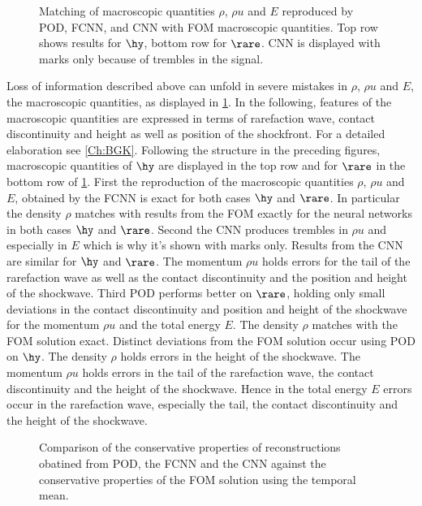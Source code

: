 \begin{figure}[H]
	
	\caption{Matching of macroscopic quantities \(\rho\), \(\rho u\) and \(E\) reproduced by POD, FCNN, and CNN with FOM macroscopic quantities. Top row shows results for \(\hy\), bottom row for \(\rare\). CNN is displayed with marks only because of trembles in the signal.}
	\label{Fig:ErrMacro}
\end{figure}
Loss of information described above can unfold in severe mistakes in \(\rho\), \(\rho u\) and \(E\), the macroscopic quantities, as displayed in \cref{Fig:ErrMacro}. In the following, features of the macroscopic quantities are expressed in terms of rarefaction wave, contact discontinuity and height as well as position of the shockfront. For a detailed elaboration see \cref{Ch:BGK}. Following the structure in the preceding figures, macroscopic quantities of \(\hy\) are displayed in the top row and for \(\rare\) in the bottom row of \cref{Fig:ErrMacro}. First the reproduction of the macroscopic quantities \(\rho\), \(\rho u\) and \(E\), obtained by the FCNN is exact for both cases \(\hy\) and \(\rare\). In particular the density \(\rho\) matches with results from the FOM exactly for the neural networks in both cases \(\hy\) and \(\rare\). Second the CNN produces trembles in \(\rho u\) and especially in \(E\) which is why it's shown with marks only. Results from the CNN are similar for \(\hy\) and \(\rare\). The momentum \(\rho u\) holds errors for the tail of the rarefaction wave as well as the contact discontinuity and the position and height of the shockwave. Third POD performs better on \(\rare\), holding only small deviations in the contact discontinuity and position and height of the shockwave for the momentum \(\rho u\) and the total energy \(E\). The density \(\rho\) matches with the FOM solution exact. Distinct deviations from the FOM solution occur using POD on \(\hy\). The density \(\rho\) holds errors in the  height of the shockwave. The momentum \(\rho u\) holds errors in the tail of the rarefaction wave, the contact discontinuity and the height of the shockwave. Hence in the total energy \(E\) errors occur in the rarefaction wave, especially the tail, the contact discontinuity and the height of the shockwave.
\begin{figure}[H]
	
	\caption{Comparison of the conservative properties of reconstructions obatined from POD, the FCNN and the CNN against the conservative properties of the FOM solution using the temporal mean.}
	\label{Fig:Conservation}
\end{figure}
